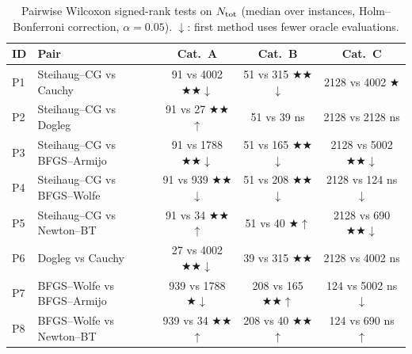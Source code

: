 \begin{table}[ht]
\centering
\small
\begin{tabular}{l l c c c}
\toprule
ID & Pair & Cat.~A & Cat.~B & Cat.~C \\
\midrule
  P1 & Steihaug--CG vs Cauchy & 91 vs 4002 ★★$\downarrow$ & 51 vs 315 ★★$\downarrow$ & 2128 vs 4002 ★ \\
  P2 & Steihaug--CG vs Dogleg & 91 vs 27 ★★$\uparrow$ & 51 vs 39 ns & 2128 vs 2128 ns \\
  P3 & Steihaug--CG vs BFGS--Armijo & 91 vs 1788 ★★$\downarrow$ & 51 vs 165 ★★$\downarrow$ & 2128 vs 5002 ★★$\downarrow$ \\
  P4 & Steihaug--CG vs BFGS--Wolfe & 91 vs 939 ★★$\downarrow$ & 51 vs 208 ★★$\downarrow$ & 2128 vs 124 ns$\downarrow$ \\
  P5 & Steihaug--CG vs Newton--BT & 91 vs 34 ★★$\uparrow$ & 51 vs 40 ★$\uparrow$ & 2128 vs 690 ★★$\downarrow$ \\
  P6 & Dogleg vs Cauchy & 27 vs 4002 ★★$\downarrow$ & 39 vs 315 ★★ & 2128 vs 4002 ns \\
  P7 & BFGS--Wolfe vs BFGS--Armijo & 939 vs 1788 ★$\downarrow$ & 208 vs 165 ★★$\uparrow$ & 124 vs 5002 ns$\downarrow$ \\
  P8 & BFGS--Wolfe vs Newton--BT & 939 vs 34 ★★$\uparrow$ & 208 vs 40 ★★$\uparrow$ & 124 vs 690 ns$\uparrow$ \\
\bottomrule
\end{tabular}
\caption{Pairwise Wilcoxon signed-rank tests on $N_{\rm tot}$ (median over instances, Holm--Bonferroni correction, $\alpha=0.05$). $\downarrow$: first method uses fewer oracle evaluations.}
\label{tab:wilcoxon}
\end{table}
